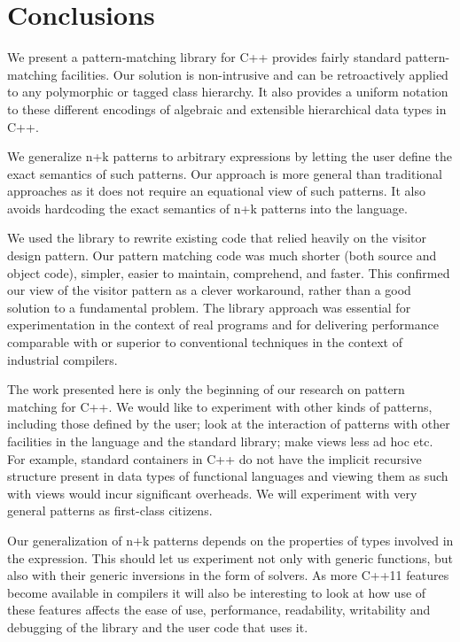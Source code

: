 \section{Conclusions} %
\label{sec:cc}

We present a pattern-matching library for C++ provides fairly standard
pattern-matching facilities. Our solution is 
non-intrusive and can be retroactively applied to any polymorphic or tagged 
class hierarchy. It also provides a uniform notation to these different 
encodings of algebraic and extensible hierarchical data types in C++.

We generalize n+k patterns to arbitrary expressions by letting the user define 
the exact semantics of such patterns. Our approach is more general than traditional approaches 
as it does not require an
equational view of such patterns. It also avoids hardcoding the 
exact semantics of n+k patterns into the language. 

We used the library to rewrite existing code that relied heavily on the 
visitor design pattern.
Our pattern matching code was much shorter (both source and object code), 
simpler, easier to maintain, comprehend, and faster. 
This confirmed our view of the visitor pattern as a clever workaround,
rather than a good solution to a fundamental problem.
The library approach was essential 
for experimentation in the context of real programs and for delivering 
performance comparable with or superior to conventional techniques in the 
context of industrial compilers.

The work presented here is only the beginning of our research on pattern 
matching for C++. We would like to experiment with other kinds of patterns, 
including those defined by the user; look at the interaction of patterns with 
other facilities in the language and the standard library; make
views less ad hoc etc. For example, standard containers in C++ do not have the 
implicit recursive structure present in data types of functional languages and 
viewing them as such with views would incur significant overheads. We will
experiment with very general patterns as first-class citizens.

Our generalization of n+k patterns depends on the properties of types involved 
in the expression. This should let us experiment not only with generic 
functions, but also with their generic inversions in the form of solvers. As 
more C++11 features become available in compilers it will also be interesting to 
look at how use of these features affects the ease of use, performance, 
readability, writability and debugging of the library and the user code that 
uses it.

